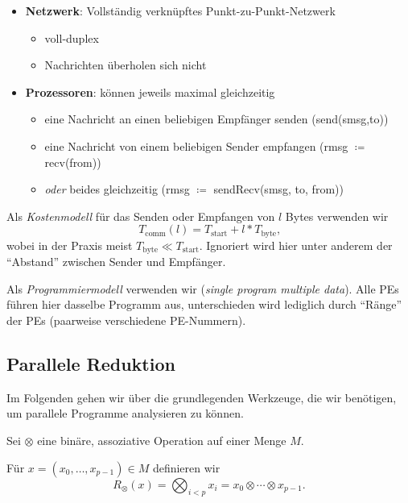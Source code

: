 \begin{itemize}
  \item \textbf{Netzwerk}: Vollständig verknüpftes Punkt-zu-Punkt-Netzwerk
  \begin{itemize}
    \item voll-duplex
    \item Nachrichten überholen sich nicht
  \end{itemize}
  \item \textbf{Prozessoren}: können jeweils maximal gleichzeitig
  \begin{itemize}
    \item eine Nachricht an einen beliebigen Empfänger senden (send(smsg,to))
    \item eine Nachricht von einem beliebigen Sender empfangen (rmsg \( \coloneqq \) recv(from))
    \item \emph{oder} beides gleichzeitig (rmsg \( \coloneqq \) sendRecv(smsg, to, from))
  \end{itemize}
\end{itemize}

Als \emph{Kostenmodell} für das Senden oder Empfangen von \( l \) Bytes verwenden wir
\begin{equation*}
  T_\text{comm}(l) = T_\text{start} + l*T_\text{byte}\text{,}
\end{equation*}
wobei in der Praxis meist \( T_\text{byte} \ll T_\text{start} \). Ignoriert wird hier unter anderem der ``Abstand'' zwischen Sender und Empfänger.

Als \emph{Programmiermodell} verwenden wir  (\emph{single program multiple data}). Alle PEs führen hier dasselbe Programm aus, unterschieden wird lediglich durch ``Ränge'' der PEs (paarweise verschiedene PE-Nummern).

\subsection{Parallele Reduktion}

Im Folgenden gehen wir über die grundlegenden Werkzeuge, die wir benötigen, um parallele Programme analysieren zu können.

\begin{definition}[Reduktion]
  Sei \( \otimes \) eine binäre, assoziative Operation auf einer Menge \( M \).

  Für \( x = (x_0,\dots,x_{p-1}) \in M \) definieren wir
  \begin{equation*}
    R_\otimes(x) = \bigotimes_{i < p}x_i = x_0 \otimes \cdots \otimes x_{p-1}\text{.}
  \end{equation*}
\end{definition}

